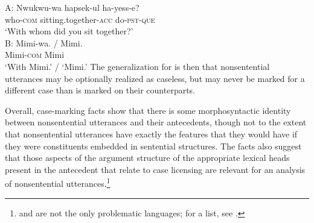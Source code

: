 \ea
A:
\gll Nwukwu-wa          hapsek-ul                     ha-yess-e?\\
     who-\textsc{com}   sitting.together-\textsc{acc} do-\textsc{pst}-\textsc{que}\\
\glt  \hphantom{A:~}`With whom did you sit together?'\\

B:
\gll Mimi-wa. 			/ Mimi.\\
     Mimi-\textsc{com} {} Mimi\\
\glt \hphantom{B:~}`With Mimi.' / `Mimi.' \label{13}\z
%
The generalization for  is then that nonsentential utterances may be optionally realized as caseless, but may never be marked for a different case than is marked on their counterparts.

Overall, case-marking facts show that there is some morphosyntactic identity between nonsentential
utterances and their antecedents, though not to the extent that nonsentential utterances have
exactly the features that they would have if they were constituents embedded in sentential
structures. The  facts also suggest that those aspects of the argument structure of
the appropriate lexical heads present in the antecedent that relate to case licensing are relevant
for an analysis of nonsentential utterances.\footnote{ and  are not the
  only problematic languages; for a list, see \citet{Vicente2015}.}

